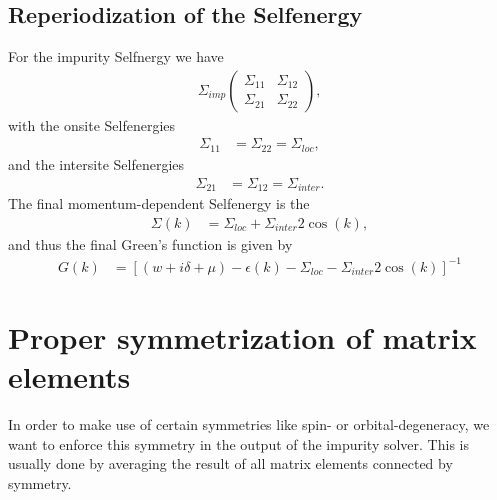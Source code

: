 \documentclass[12pt,a4paper]{scrartcl}
\numberwithin{equation}{section}
\begin{document}
\subsection{Reperiodization of the Selfenergy}
For the impurity Selfnergy we have
\begin{align}
\Sigma_{imp}
 \begin{pmatrix}
  \Sigma_{11} & \Sigma_{12} \\
  \Sigma_{21} & \Sigma_{22}
 \end{pmatrix},
\end{align}
with the onsite Selfenergies
\begin{align}
 \Sigma_{11} &= \Sigma_{22} = \Sigma_{loc},
\end{align}
and the intersite Selfenergies
\begin{align}
 \Sigma_{21} &= \Sigma_{12} = \Sigma_{inter}.
\end{align}
The final momentum-dependent Selfenergy is the 
\begin{align}
 \Sigma(k) &= \Sigma_{loc} + \Sigma_{inter} 2 \cos( k),
\end{align}
and thus the final Green's function is given by
\begin{align}
 G(k) &= \left[ (w+i\delta+\mu ) - \epsilon(k) - \Sigma_{loc} - \Sigma_{inter} 2 \cos( k) \right]^{-1}
\end{align}



\section{Proper symmetrization of matrix elements}
In order to make use of certain symmetries like spin- or orbital-degeneracy,
we want to enforce this symmetry in the output of the impurity solver.
This is usually done by averaging the result of all matrix elements
connected by symmetry.
\end{document}
